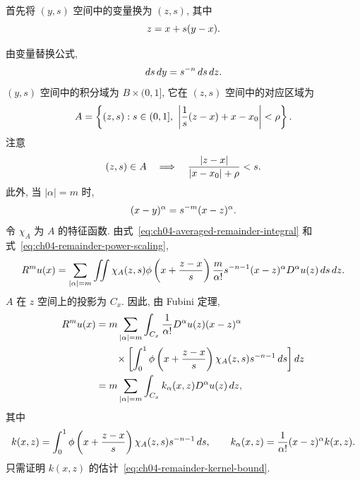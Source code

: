 \begin{Proof}
首先将 $(y,s)$ 空间中的变量换为 $(z,s)$, 其中
\begin{equation}
\MathBookFormulaID{formula-ch04-remainder-change-variable}
\label{eq:ch04-remainder-change-variable}
z=x+s(y-x).
\end{equation}

由变量替换公式,
\begin{equation}
\MathBookFormulaID{formula-ch04-remainder-jacobian}
\label{eq:ch04-remainder-jacobian}
ds\,dy=s^{-n}\,ds\,dz.
\end{equation}
$(y,s)$ 空间中的积分域为 $B\times(0,1]$, 它在 $(z,s)$ 空间中的对应区域为
\[
\MathBookFormulaID{formula-ch04-remainder-domain-a}
A=\left\{(z,s):s\in(0,1],\ \left|\frac1s(z-x)+x-x_0\right|<\rho\right\}.
\]
注意
\begin{equation}
\MathBookFormulaID{formula-ch04-remainder-domain-ratio}
\label{eq:ch04-remainder-domain-ratio}
(z,s)\in A\quad\Longrightarrow\quad
\frac{|z-x|}{|x-x_0|+\rho}<s.
\end{equation}
此外, 当 $|\alpha|=m$ 时,
\begin{equation}
\MathBookFormulaID{formula-ch04-remainder-power-scaling}
\label{eq:ch04-remainder-power-scaling}
(x-y)^\alpha=s^{-m}(x-z)^\alpha.
\end{equation}
令 $\chi_A$ 为 $A$ 的特征函数. 由式~\eqref{eq:ch04-averaged-remainder-integral} 和式~\eqref{eq:ch04-remainder-power-scaling},
\begin{equation}
\MathBookFormulaID{formula-ch04-remainder-after-change-variable}
\label{eq:ch04-remainder-after-change-variable}
R^m u(x)=\sum_{|\alpha|=m}\iint
\chi_A(z,s)\phi\left(x+\frac{z-x}{s}\right)
\frac{m}{\alpha!}s^{-n-1}(x-z)^\alpha D^\alpha u(z)\,ds\,dz.
\end{equation}
$A$ 在 $z$ 空间上的投影为 $C_x$. 因此, 由 Fubini 定理,
\[
\MathBookFormulaID{formula-ch04-remainder-fubini-representation}
\begin{aligned}
R^m u(x)
&=m\sum_{|\alpha|=m}\int_{C_x}\frac1{\alpha!}D^\alpha u(z)(x-z)^\alpha\\
&\qquad\times\left[\int_0^1\phi\left(x+\frac{z-x}{s}\right)
\chi_A(z,s)s^{-n-1}\,ds\right]dz\\
&=m\sum_{|\alpha|=m}\int_{C_x}k_\alpha(x,z)D^\alpha u(z)\,dz,
\end{aligned}
\]
其中
\[
\MathBookFormulaID{formula-ch04-remainder-kernel-definition}
k(x,z)=\int_0^1\phi\left(x+\frac{z-x}{s}\right)\chi_A(z,s)s^{-n-1}\,ds,
\qquad
k_\alpha(x,z)=\frac1{\alpha!}(x-z)^\alpha k(x,z).
\]
只需证明 $k(x,z)$ 的估计~\eqref{eq:ch04-remainder-kernel-bound}.


\end{Proof}
